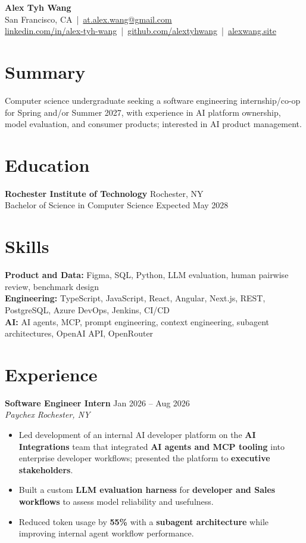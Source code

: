 \documentclass[10pt,letterpaper]{article}
\newif\ifresumeFirstRole
\newcommand{\resumeRole}[4]{%
  \ifresumeFirstRole
    \global\resumeFirstRolefalse
  \else
    \vspace{0pt plus 1fill}%
  \fi
  \textbf{#1} \hfill #2\\
  \textit{#3} \hfill \textit{#4}
}
\begin{document}
\begin{center}
{\Large \textbf{Alex Tyh Wang}}\\
San Francisco, CA \,|\, \href{mailto:at.alex.wang@gmail.com}{at.alex.wang@gmail.com}\\
\small \href{https://www.linkedin.com/in/alex-tyh-wang/}{linkedin.com/in/alex-tyh-wang} \,|\, \href{https://github.com/alextyhwang}{github.com/alextyhwang} \,|\, \href{https://alexwang.site}{alexwang.site}
\end{center}

\section*{Summary}
Computer science undergraduate seeking a software engineering internship/co-op for Spring and/or Summer 2027, with experience in AI platform ownership, model evaluation, and consumer products; interested in AI product management.

\section*{Education}
\textbf{Rochester Institute of Technology} \hfill Rochester, NY\\
Bachelor of Science in Computer Science \hfill Expected May 2028

\section*{Skills}
\textbf{Product and Data:} Figma, SQL, Python, LLM evaluation, human pairwise review, benchmark design\\
\textbf{Engineering:} TypeScript, JavaScript, React, Angular, Next.js, REST, PostgreSQL, Azure DevOps, Jenkins, CI/CD\\
\textbf{AI:} AI agents, MCP, prompt engineering, context engineering, subagent architectures, OpenAI API, OpenRouter

\section*{Experience}
\resumeRole{Software Engineer Intern}{Jan 2026 -- Aug 2026}{Paychex}{Rochester, NY}
\begin{itemize}
  \item Led development of an internal AI developer platform on the \textbf{AI Integrations} team that integrated \textbf{AI agents and MCP tooling} into enterprise developer workflows; presented the platform to \textbf{executive stakeholders}.
  \item Built a custom \textbf{LLM evaluation harness} for \textbf{developer and Sales workflows} to assess model reliability and usefulness.
  \item Reduced token usage by \textbf{55\%} with a \textbf{subagent architecture} while improving internal agent workflow performance.
\end{itemize}
\end{document}
